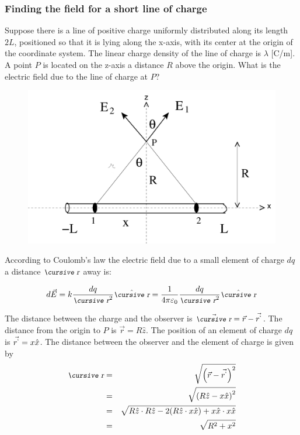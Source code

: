 \documentclass[12pt]{article}
\begin{document}

\subsubsection*{\bf Finding the field for a short line of charge}

Suppose there is a line of positive charge uniformly distributed along its  length $2L$, positioned so that it is lying along the x-axis, with its center at the origin of the coordinate system.  The linear charge density of the line of charge is $\lambda$ [C/m].  A point $P$ is located on the z-axis a distance $R$ above the origin.  What is the electric field due to the line of charge at $P$?
\vspace{.2in}

\begin{figure}[h]
\centering
\includegraphics*[width=.6\columnwidth]{bar.png}
\label{fig:chrgbar}
\end{figure}

According to Coulomb's law the electric field due to a small element of charge $dq$ a distance $\text{\small\slshape\cursive r}$ away is:

\[
d\vec{E}=k\frac{dq}{ \text{\small\slshape\cursive r}^{2}}\hat{ \text{\small\slshape\cursive r}}=\frac{1}{4\pi \varepsilon_{0}}\frac{dq}{ \text{\small\slshape\cursive r}^{2}}\hat{ \text{\small\slshape\cursive r}}
\]

The distance between the charge and the observer is $\vec{\text{\small\slshape\cursive r}}=\vec{r}-\vec{r^{`}}$.  The distance from the origin to $P$ is $\vec{r}=R\hat{z}$.  The position of an element of charge $dq$ is $\vec{r^{`}}=x\hat{x}$.  The distance between the observer and the element of charge is given by
\begin{eqnarray*}
 \text{\small\slshape\cursive r} & =& \sqrt{ \left( \vec{r} - \vec{r^{`}} \right)^{2} } \\
 & = & \sqrt{ \left( R\hat{z} - x\hat{x} \right)^{2} } \\
 & = & \sqrt{  R\hat{z} \cdot R\hat{z} -2(R\hat{z} \cdot x\hat{x}) + x\hat{x} \cdot x\hat{x} } \\
  & = & \sqrt{  R^{2} + x^{2} } 
\end{eqnarray*}
\end{document}
